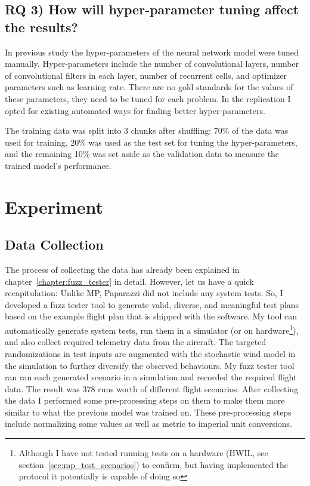 \subsection{RQ 3) How will hyper-parameter tuning affect the results?}
In previous study the hyper-parameters of the neural network model were tuned manually. Hyper-parameters include the number of convolutional layers, number of convolutional filters in each layer, number of recurrent cells, and optimizer parameters such as learning rate. There are no gold standards for the values of these parameters, they need to be tuned for each problem. In the replication I opted for existing automated ways for finding better hyper-parameters.

The training data was split into 3 chunks after shuffling: 70\% of the data was used for training, 20\% was used as the test set for tuning the hyper-parameters, and the remaining 10\% was set aside as the validation data to measure the trained model's performance. 


\section{Experiment}
\subsection{Data Collection}
The process of collecting the data has already been explained in chapter~\ref{chapter:fuzz_tester} in detail. However, let us have a quick recapitulation:
Unlike MP, Paparazzi did not include any system tests. So, I developed a fuzz tester tool to generate valid, diverse, and meaningful test plans based on the example flight plan that is shipped with the software. My tool can automatically generate system tests, run them in a simulator (or on hardware\footnote{Although I have not tested running tests on a hardware (HWIL, see section~\ref{sec:mp_test_scenarios}) to confirm, but having implemented the protocol it potentially is capable of doing so}), and also collect required telemetry data from the aircraft. The targeted randomizations in test inputs are augmented with the stochastic wind model in the simulation to further diversify the observed behaviours. My fuzz tester tool ran ran each generated scenario in a simulation and recorded the required flight data.
The result was 378 runs worth of different flight scenarios.
After collecting the data I performed some pre-processing steps on them to make them more similar to what the previous model was trained on. These pre-processing steps include normalizing some values as well as metric to imperial unit conversions.

